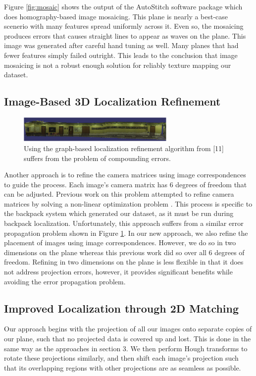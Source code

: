 \documentclass[10pt,twocolumn,letterpaper]{article}
\begin{document}
Figure \ref{fig:mosaic} shows the output of the AutoStitch software
package which does homography-based image mosaicing. This plane is
nearly a best-case scenerio with many features spread uniformly across
it. Even so, the mosaicing produces errors that causes straight lines
to appear as waves on the plane. This image was generated after
careful hand tuning as well. Many planes that had fewer features simply
failed outright. This leads to the conclusion that image mosaicing is not a
robust enough solution for reliably texture mapping our dataset.

\subsection{Image-Based 3D Localization Refinement}

\begin{figure}
  \centering
  \includegraphics[width=3in]{Graph_crop.pdf}
  \caption{Using the graph-based localization refinement algorithm
    from [11] suffers from the problem of compounding errors. }
  \label{fig:graph}
\end{figure}

Another approach is to refine the camera matrices using image
correspondences to guide the process. Each image's camera matrix has 6
degrees of freedom that can be adjusted. Previous work on this problem attempted to refine camera
matrices by solving a non-linear optimization problem
\cite{liu2010indoor}. This process is specific to the backpack system
which generated our dataset, as it must be run during backpack
localization\cite{liu2010indoor,chen2010indoor}. Unfortunately, this
approach suffers from a similar error propagation problem shown in
Figure \ref{fig:graph}. In our new approach, we also refine the
placement of images using image correspondences. However, we do so in
two dimensions on the plane whereas this previous work did so over all
6 degrees of freedom. Refining in two dimensions on the plane is less
flexible in that it does not address projection errors, however, it
provides significant benefits while avoiding the error propagation
problem.


\subsection{Improved Localization through 2D Matching}
Our approach begins with the projection of all our images onto
separate copies of our plane, such that no projected data is covered
up and lost. This is done in the same way as the approaches in section
3. We then perform Hough transforms to rotate these projections
similarly, and then shift each image's projection such that its
overlapping regions with other projections are as seamless as
possible.
\end{document}
